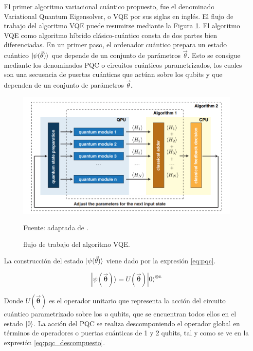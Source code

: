 El primer algoritmo variacional cuántico propuesto, fue el denominado  Variational Quantum Eigensolver, o VQE \citep{peruzzo} por sus siglas en inglés. El flujo de trabajo del algoritmo VQE puede resumirse mediante la Figura \ref{fig:vqe}. El algoritmo VQE como algoritmo híbrido clásico-cuántico consta de dos partes bien diferenciadas. En un primer paso, el ordenador cuántico prepara un estado cuántico $\ket{\psi(\Vec{\theta})}$ que depende de un conjunto de parámetros $\Vec{\theta}$. Esto se consigue mediante los denominados \mbox{PQC} o circuitos cuánticos parametrizados, los cuales son una secuencia de puertas cuánticas que actúan sobre los qubits y que dependen de un conjunto de parámetros $\Vec{\theta}$.

\newpage

\begin{figure}[!ht]
    \centering
    \includegraphics[scale = 0.7]{img/03-vqe_workflow.png}
    \caption{flujo de trabajo del algoritmo VQE.}
    Fuente: adaptada de \cite{peruzzo}.
    \label{fig:vqe}
\end{figure}

La construcción del estado $\ket{\psi(\Vec{\theta})}$ viene dado por la expresión \ref{eq:pqc}.

\begin{equation}
    |\psi(\boldsymbol{\Vec{\theta}}) \rangle = U(\boldsymbol{\Vec{\theta}}) |0\rangle^{\otimes n}
    \label{eq:pqc}
\end{equation}

Donde $U(\boldsymbol{\Vec{\theta}})$ es el operador unitario que representa la acción del circuito cuántico parametrizado sobre los \textit{n} qubits, que se encuentran todos ellos en el estado $\ket{0}$. La acción del \mbox{PQC} se realiza descomponiendo el operador global en términos de operadores o puertas cuánticas de 1 y 2 qubits, tal y como se ve en la expresión \ref{eq:pqc_descompuesto}.

